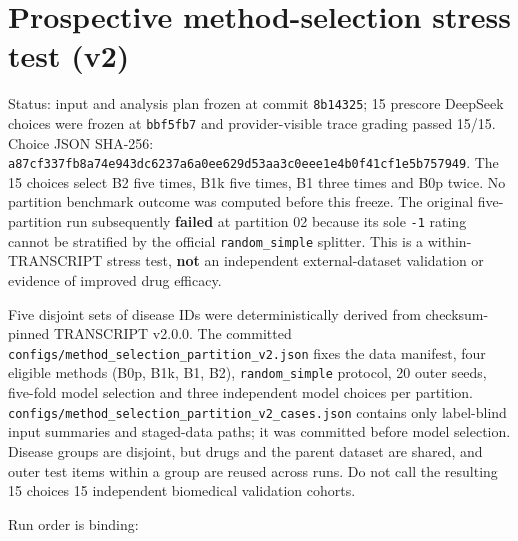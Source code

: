 \documentclass[
  10pt,
]{ctexart}
\author{}
\date{}
\begin{document}
\section{Prospective method-selection stress test
(v2)}\label{prospective-method-selection-stress-test-v2}

Status: input and analysis plan frozen at commit \texttt{8b14325}; 15
prescore DeepSeek choices were frozen at \texttt{bbf5fb7} and
provider-visible trace grading passed 15/15. Choice JSON SHA-256:
\texttt{a87cf337fb8a74\allowbreak{}e943dc6237a6a0\allowbreak{}ee629d53aa3c0e\allowbreak{}ee1e4b0f41cf1e\allowbreak{}5b757949}.
The 15 choices select B2 five times, B1k five times, B1 three times and
B0p twice. No partition benchmark outcome was computed before this
freeze. The original five-partition run subsequently \textbf{failed} at
partition 02 because its sole \texttt{-1} rating cannot be stratified by
the official \texttt{random\_\allowbreak{}simple} splitter. This is a
within-TRANSCRIPT stress test, \textbf{not} an independent
external-dataset validation or evidence of improved drug efficacy.

Five disjoint sets of disease IDs were deterministically derived from
checksum-pinned TRANSCRIPT v2.0.0. The committed
\texttt{configs/\allowbreak{}method\_\allowbreak{}selection\_\allowbreak{}partition\_\allowbreak{}v2.\allowbreak{}json} fixes the data
manifest, four eligible methods (B0p, B1k, B1, B2),
\texttt{random\_\allowbreak{}simple} protocol, 20 outer seeds, five-fold model
selection and three independent model choices per partition.
\texttt{configs/\allowbreak{}method\_\allowbreak{}selection\_\allowbreak{}partition\_\allowbreak{}v2\_\allowbreak{}cases.\allowbreak{}json} contains
only label-blind input summaries and staged-data paths; it was committed
before model selection. Disease groups are disjoint, but drugs and the
parent dataset are shared, and outer test items within a group are
reused across runs. Do not call the resulting 15 choices 15 independent
biomedical validation cohorts.

Run order is binding:
\end{document}

